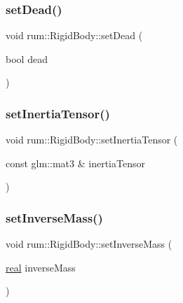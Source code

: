 \mbox{\label{classrum_1_1_rigid_body_a54f9d7a3a62ce43ebb01b4e0b3734481}} 
\subsubsection{\texorpdfstring{set\+Dead()}{setDead()}}
{\footnotesize\ttfamily void rum\+::\+Rigid\+Body\+::set\+Dead (\begin{DoxyParamCaption}\item[{bool}]{dead }\end{DoxyParamCaption})}

\mbox{\label{classrum_1_1_rigid_body_a15fd4045586f493df7611c7d362bff16}} 
\subsubsection{\texorpdfstring{set\+Inertia\+Tensor()}{setInertiaTensor()}}
{\footnotesize\ttfamily void rum\+::\+Rigid\+Body\+::set\+Inertia\+Tensor (\begin{DoxyParamCaption}\item[{const glm\+::mat3 \&}]{inertia\+Tensor }\end{DoxyParamCaption})}

\mbox{\label{classrum_1_1_rigid_body_a2e6890fd82efab0d277eb3a0e899ad24}} 
\subsubsection{\texorpdfstring{set\+Inverse\+Mass()}{setInverseMass()}}
{\footnotesize\ttfamily void rum\+::\+Rigid\+Body\+::set\+Inverse\+Mass (\begin{DoxyParamCaption}\item[{\mbox{\hyperlink{namespacerum_a7e8cca23573d5eaead0f138cbaa4862c}{real}}}]{inverse\+Mass }\end{DoxyParamCaption})}

